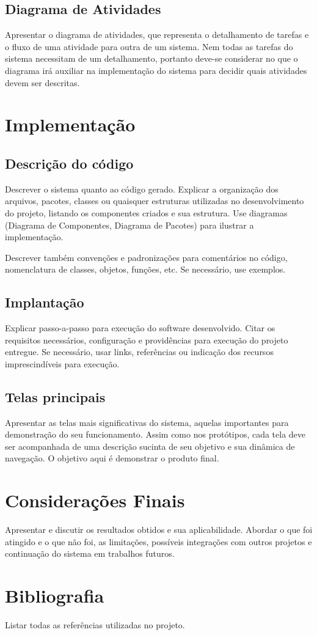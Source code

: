 \documentclass[a4paper,12pt]{article}
\begin{document}
\subsection{Diagrama de Atividades}
Apresentar o diagrama de atividades, que representa o detalhamento de tarefas e o fluxo de uma atividade para outra de um sistema. Nem todas as tarefas do sistema necessitam de um detalhamento, portanto deve-se considerar no que o diagrama irá auxiliar na implementação do sistema para decidir quais atividades devem ser descritas.

\newpage
\section{Implementação}
\subsection{Descrição do código}
Descrever o sistema quanto ao código gerado. Explicar a organização dos arquivos, pacotes, classes ou quaisquer estruturas utilizadas no desenvolvimento do projeto, listando os componentes criados e sua estrutura. Use diagramas (Diagrama de Componentes, Diagrama de Pacotes) para ilustrar a implementação.

Descrever também convenções e padronizações para comentários no código, nomenclatura de classes, objetos, funções, etc. Se necessário, use exemplos.

\subsection{Implantação}
Explicar passo-a-passo para execução do software desenvolvido. Citar os requisitos necessários, configuração e providências para execução do projeto entregue. Se necessário, usar links, referências ou indicação dos recursos imprescindíveis para execução.

\subsection{Telas principais}
Apresentar as telas mais significativas do sistema, aquelas importantes para demonstração do seu funcionamento. Assim como nos protótipos, cada tela deve ser acompanhada de uma descrição sucinta de seu objetivo e sua dinâmica de navegação. O objetivo aqui é demonstrar o produto final.

\newpage
\section{Considerações Finais}
Apresentar e discutir os resultados obtidos e sua aplicabilidade. Abordar o que foi atingido e o que não foi, as limitações, possíveis integrações com outros projetos e continuação do sistema em trabalhos futuros.

\newpage
\section{Bibliografia}

Listar todas as referências utilizadas no projeto.
\end{document}
